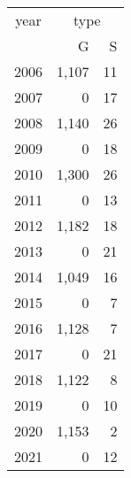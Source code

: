 \footnotesize\begin{tabular}[t]{lrr}
\toprule
\multicolumn{1}{c}{year} & \multicolumn{2}{c}{type} \\
\cmidrule(l{3pt}r{3pt}){1-1} \cmidrule(l{3pt}r{3pt}){2-3}
  & G & S\\
\midrule
2006 & 1,107 & 11\\
2007 & 0 & 17\\
2008 & 1,140 & 26\\
2009 & 0 & 18\\
2010 & 1,300 & 26\\
2011 & 0 & 13\\
2012 & 1,182 & 18\\
2013 & 0 & 21\\
2014 & 1,049 & 16\\
2015 & 0 & 7\\
2016 & 1,128 & 7\\
2017 & 0 & 21\\
2018 & 1,122 & 8\\
2019 & 0 & 10\\
2020 & 1,153 & 2\\
2021 & 0 & 12\\
\bottomrule
\end{tabular}
